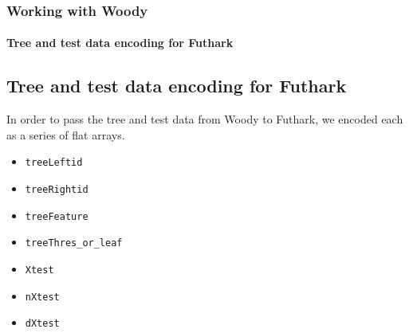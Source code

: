 \documentclass[12pt,t]{beamer}
\begin{document}
\begin{frame}
  \frametitle{Working with Woody}
  \framesubtitle{Tree and test data encoding for Futhark}
\subsection{Tree and test data encoding for Futhark}

In order to pass the tree and test data from Woody to Futhark, we encoded each as a series of flat arrays.

\begin{itemize}
  \item \texttt{treeLeftid}
  \item \texttt{treeRightid}
  \item \texttt{treeFeature}
  \item \texttt{treeThres\_or\_leaf}
\end{itemize}

\begin{itemize}
  \item \texttt{Xtest}
  \item \texttt{nXtest}
  \item \texttt{dXtest}
\end{itemize}

%
%

\end{frame}
\end{document}
